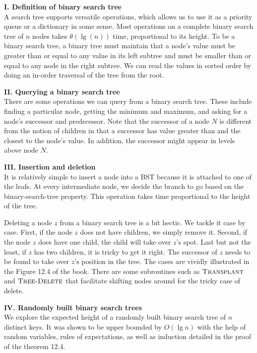 \documentclass[11pt]{article}
\theoremstyle{definition}
\theoremstyle{theorem}
\newcommand{\solution}{\medskip\noindent{\color{DarkBlue}\textbf{Solution:}}}
\begin{document}
\solution

\textbf{I. Definition of binary search tree} \\
A search tree supports versatile operations, which allows us to use it as a priority queue or a dictionary in some sense. Most operations on a complete binary search tree of $n$ nodes takes $\theta{(\lg(n))}$ time, proportional to its height. To be a binary search tree, a binary tree must maintain that a node’s value must be greater than or equal to any value in its left subtree and must be smaller than or equal to any node in the right subtree. We can read the values in sorted order by doing an in-order traversal of the tree from the root. 


\textbf{II. Querying a binary search tree} \\
There are some operations we can query from a binary search tree. These include finding a particular node, getting the minimum and maximum, and asking for a node’s successor and predecessor. Note that the successor of a node $N$ is different from the notion of children in that a successor has value greater than and the closest to the node’s value. In addition, the successor might appear in levels above node $N$. 


\textbf{III. Insertion and deletion} \\
It is relatively simple to insert a node into a BST because it is attached to one of the leafs. At every intermediate node, we decide the branch to go based on the binary-search-tree property. This operation takes time proportional to the height of the tree.

Deleting a node $z$ from a binary search tree is a bit hectic. We tackle it case by case. First, if the node $z$ does not have children, we simply remove it. Second, if the node $z$ does have one child, the child will take over $z$’s spot. Last but not the least, if $z$ has two children, it is tricky to get it right. The successor of $z$ needs to be found to take over $z$’s position in the tree. The cases are vividly illustrated in the Figure 12.4 of the book. There are some subroutines such as $\textproc{\textsc{Transplant}}$ and $\textproc{\textsc{Tree-Delete}}$ that facilitate shifting nodes around for the tricky case of delete. 

\textbf{IV. Randomly built binary search trees} \\
We explore the expected height of a randomly built binary search tree of $n$ distinct keys. It was shown to be upper bounded by $O(\lg n)$ with the help of random variables, rules of expectations, as well as induction detailed in the proof of the theorem 12.4.
\end{document}
